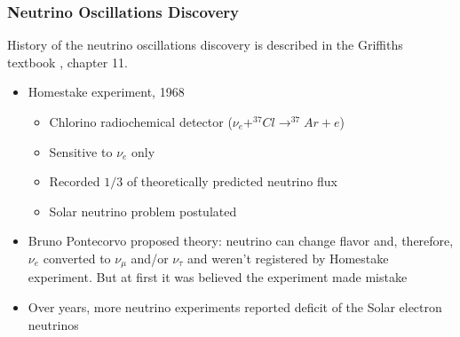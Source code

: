 \begin{frame}\frametitle{Neutrino Oscillations Discovery}
\scriptsize
History of the neutrino oscillations discovery is described in the Griffiths textbook \cite{ref_Griffiths}, chapter 11.
\begin{itemize}
  \scriptsize
  \item Homestake experiment, 1968
  \begin{itemize}
     \scriptsize
     \item Chlorino radiochemical detector ($\nu_e + ^{37}Cl \rightarrow ^{37}Ar+e$) 
     \item Sensitive to $\nu_e$ only 
     \item Recorded $1/3$ of theoretically predicted neutrino flux
     \item Solar neutrino problem postulated
  \end{itemize}
  \scriptsize
  \item Bruno Pontecorvo proposed theory: neutrino can change flavor and, therefore, $\nu_e$ converted to $\nu_\mu$ and/or $\nu_\tau$ and weren't registered by Homestake experiment. But at first it was believed the experiment made mistake
  \item Over years, more neutrino experiments reported deficit of the Solar electron neutrinos
\end{itemize} 
\end{frame}

